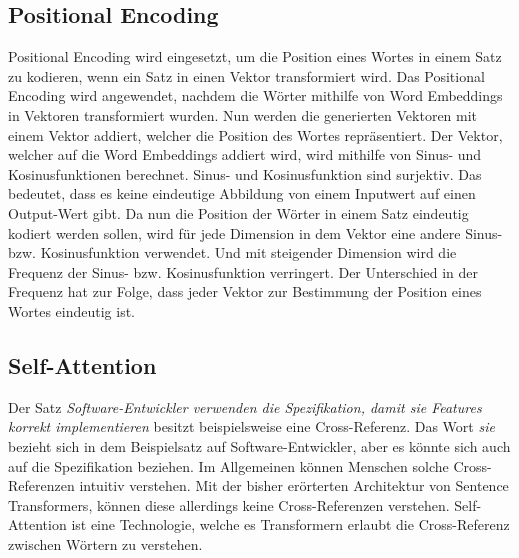 \subsection{Positional Encoding}
\label{chap:positional-encoding}
Positional Encoding wird eingesetzt, um die Position eines Wortes in einem Satz zu kodieren, wenn ein Satz in einen Vektor transformiert wird.
Das Positional Encoding wird angewendet, nachdem die Wörter mithilfe von Word Embeddings in Vektoren transformiert wurden.
Nun werden die generierten Vektoren mit einem Vektor addiert, welcher die Position des Wortes repräsentiert.
Der Vektor, welcher auf die Word Embeddings addiert wird, wird mithilfe von Sinus- und Kosinusfunktionen berechnet.
Sinus- und Kosinusfunktion sind surjektiv.
Das bedeutet, dass es keine eindeutige Abbildung von einem Inputwert auf einen Output-Wert gibt.
Da nun die Position der Wörter in einem Satz eindeutig kodiert werden sollen, wird für jede Dimension in dem Vektor eine andere Sinus- bzw. Kosinusfunktion verwendet.
Und mit steigender Dimension wird die Frequenz der Sinus- bzw. Kosinusfunktion verringert.
Der Unterschied in der Frequenz hat zur Folge, dass jeder Vektor zur Bestimmung der Position eines Wortes eindeutig ist.

\subsection{Self-Attention}
\label{chap:self-attention}
Der Satz \textit{Software-Entwickler verwenden die Spezifikation, damit sie Features korrekt implementieren} besitzt beispielsweise eine Cross-Referenz.
Das Wort \textit{sie} bezieht sich in dem Beispielsatz auf Software-Entwickler, aber es könnte sich auch auf die Spezifikation beziehen.
Im Allgemeinen können Menschen solche Cross-Referenzen intuitiv verstehen.
Mit der bisher erörterten Architektur von Sentence Transformers, können diese allerdings keine Cross-Referenzen verstehen.
Self-Attention ist eine Technologie, welche es Transformern erlaubt die Cross-Referenz zwischen Wörtern zu verstehen.\\

